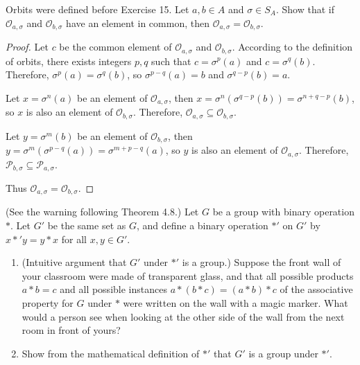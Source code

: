 \newpage
\begin{exercise}
    Orbits were defined before Exercise 15. Let $a, b\in A$ and $\sigma\in S_{A}$. Show that if $\mathcal{O}_{a,\sigma}$ and $\mathcal{O}_{b,\sigma}$ have an element in common, then $\mathcal{O}_{a,\sigma} = \mathcal{O}_{b,\sigma}$.
\end{exercise}

\begin{proof}
    Let $c$ be the common element of $\mathcal{O}_{a,\sigma}$ and $\mathcal{O}_{b,\sigma}$. According to the definition of orbits, there exists integers $p, q$ such that $c = \sigma^{p}(a)$ and $c = \sigma^{q}(b)$. Therefore, $\sigma^{p}(a) = \sigma^{q}(b)$, so $\sigma^{p-q}(a) = b$ and $\sigma^{q-p}(b) = a$.

    Let $x = \sigma^{n}(a)$ be an element of $\mathcal{O}_{a,\sigma}$, then $x = \sigma^{n}(\sigma^{q-p}(b)) = \sigma^{n+q-p}(b)$, so $x$ is also an element of $\mathcal{O}_{b,\sigma}$. Therefore, $\mathcal{O}_{a,\sigma} \subseteq \mathcal{O}_{b,\sigma}$.

    Let $y = \sigma^{m}(b)$ be an element of $\mathcal{O}_{b,\sigma}$, then $y = \sigma^{m}(\sigma^{p-q}(a)) = \sigma^{m+p-q}(a)$, so $y$ is also an element of $\mathcal{O}_{a,\sigma}$. Therefore, $\mathcal{P}_{b,\sigma} \subseteq \mathcal{P}_{a,\sigma}$.

    Thus $\mathcal{O}_{a,\sigma} = \mathcal{O}_{b,\sigma}$.
\end{proof}

\newpage
\begin{exercise}
    (See the warning following Theorem 4.8.) Let $G$ be a group with binary operation $*$. Let $G'$ be the same set as $G$, and define a binary operation $*'$ on $G'$ by $x *' y = y * x$ for all $x, y\in G'$.
    \begin{enumerate}[label={\textbf{\alph*.}}]
        \item (Intuitive argument that $G'$ under $*'$ is a group.) Suppose the front wall of your classroom were made of transparent glass, and that all possible products $a * b = c$ and all possible instances $a * (b * c) = (a * b) * c$ of the associative property for $G$ under $*$ were written on the wall with a magic marker. What would a person see when looking at the other side of the wall from the next room in front of yours?
        \item Show from the mathematical definition of $*'$ that $G'$ is a group under $*'$.
    \end{enumerate}
\end{exercise}

